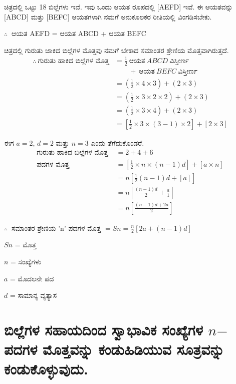 ಚಿತ್ರದಲ್ಲಿ ಒಟ್ಟು 18 ಬಿಲ್ಲೆಗಳು ಇವೆ. ಇವು ಒಂದು ಆಯತ ರೂಪದಲ್ಲಿ [AEFD] ಇವೆ. ಈ ಆಯತವನ್ನು [ABCD] ಮತ್ತು [BEFC] ಆಯತಗಳಾಗಿ ನಮಗೆ ಅನುಕೂಲಕರ ರೀತಿಯಲ್ಲಿ ವಿಂಗಡಿಸಬೇಕು. 

$\therefore~$ ಆಯತ AEFD = ಆಯತ ABCD + ಆಯತ BEFC

ಚಿತ್ರದಲ್ಲಿ ಗುರುತು ಜಾಕಿದ ಬಿಲ್ಲೆಗಳ ಮೊತ್ತವು ನಮಗೆ ಬೇಕಾದ ಸಮಾಂತರ ಶ್ರೇಣಿಯ ಮೊತ್ತವಾಗಿರುತ್ತದೆ. 
\begin{align*}
\therefore~ \text{ಗುರುತು ಹಾಕಿದ ಬಿಲ್ಲೆಗಳ ಮೊತ್ತ} & = \frac{1}{2} ~\text{ಆಯತ}~ ABCD ~\text{ವಿಸ್ತೀರ್ಣ}~ \\
& \qquad + ~\text{ಆಯತ}~ BEFC ~\text{ವಿಸ್ತೀರ್ಣ}\\
& = \left(\frac{1}{2} \times 4 \times 3 \right) + (2 \times 3)\\
& = \left(\frac{1}{2} \times 3 \times 2 \times 2\right) + (2 \times 3)\\
& = \left(\frac{1}{2} \times 3 \times 4 \right) + (2 \times 3)\\
& = \left[\frac{1}{2} \times 3 \times (3-1) \times 2 \right]+[2 \times 3]
\end{align*}

ಈಗ $a = 2$, $d = 2$ ಮತ್ತು $n = 3$ ಎಂದು ತೆಗೆದುಕೊಂಡರೆ. 
\begin{align*}
\text{ಗುರುತು ಹಾಕಿದ ಬಿಲ್ಲೆಗಳ ಮೊತ್ತ }   & = 2 + 4 + 6 \\
\text{ಪದಗಳ ಮೊತ್ತ } & = \left[\frac{1}{2} \times n \times (n-1)d \right] + [a \times n]\\
& = n \left[\frac{1}{2} (n - 1)d + [a]\right]\\
& = n \left[\frac{(n-1)d}{2} + \frac{a}{1} \right]\\
& = n \left[\frac{(n-1)d + 2a}{2} \right]
\end{align*}

$\therefore~$ ಸಮಾಂತರ ಶ್ರೇಣಿಯ 'n' ಪದಗಳ ಮೊತ್ತ $= Sn = \frac{n}{2} [2a + (n-1)d]$

$Sn$ = ಮೊತ್ತ

$n$ = ಸಂಖ್ಯೆಗಳು

$a$ = ಮೊದಲನೇ ಪದ

$d$ = ಸಾಮಾನ್ಯ ವ್ಯತ್ಯಾಸ 


\section{ಬಿಲ್ಲೆಗಳ ಸಹಾಯದಿಂದ ಸ್ವಾಭಾವಿಕ ಸಂಖ್ಯೆಗಳ $n$$-$ಪದಗಳ ಮೊತ್ತವನ್ನು ಕಂಡುಹಿಡಿಯುವ ಸೂತ್ರವನ್ನು ಕಂಡುಕೊಳ್ಳುವುದು.}\label{sec3.12}%

